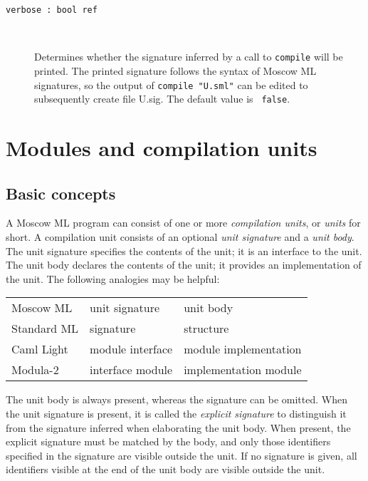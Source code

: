 \documentclass[fleqn]{article}
\begin{document}
\begin{description}
\item[{\tt verbose :\ bool ref}]\mbox{ }

  Determines whether the signature inferred by a call to {\tt compile}
  will be printed.  The printed signature follows the syntax of Moscow
  ML signatures, so the output of {\tt compile "{\rm U.sml}"} can be
  edited to subsequently create file U.sig.  The default value is {\tt
    false}.
\end{description}


\section{Modules and compilation units}
\label{sec-compilation-units}


\subsection{Basic concepts}

A Moscow ML program can consist of one or more {\em compilation
  units\/}, or {\em units\/} for short.  A compilation unit consists
of an optional {\em unit signature\/} and a {\em unit body\/}.  The
unit signature specifies the contents of the unit; it is an interface
to the unit.  The unit body declares the contents of the unit; it
provides an implementation of the unit.  The following analogies may
be helpful:

\begin{center}
\begin{tabular}{@{}|l|ll|}\hline
Moscow ML       & unit signature &      unit body\\
Standard ML     & signature      &      structure\\
Caml Light      & module interface &    module implementation\\
Modula-2        & interface module &    implementation module\\\hline
\end{tabular}
\end{center}

\noindent The unit body is always present, whereas the signature can
be omitted.  When the unit signature is present, it is called the {\em
  explicit signature\/} to distinguish it from the signature inferred
when elaborating the unit body.  When present, the explicit signature
must be matched by the body, and only those identifiers specified in
the signature are visible outside the unit.  If no signature is given,
all identifiers visible at the end of the unit body are visible
outside the unit.
\end{document}
